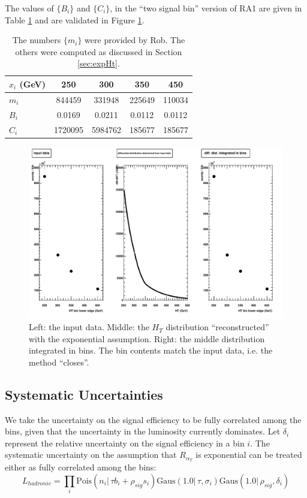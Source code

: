 The values of $\{B_i\}$ and $\{C_i\}$, in the ``two signal bin'' version of RA1 are given in Table \ref{tab:bsandcs}
and are validated in Figure \ref{fig:validationPlots}.
\begin{table}[hb]
  \begin{tabular}{| l | c c c c |}
    \hline
    $x_i$ (GeV) & 250 & 300 & 350 & 450 \\
    \hline
    $m_i$ & 844459 & 331948 & 225649 & 110034 \\
    $B_i$ & 0.0169 & 0.0211 & 0.0112 & 0.0112 \\
    $C_i$ & 1720095 & 5984762 & 185677 & 185677 \\
    \hline
  \end{tabular}
  \caption{The numbers $\{m_i\}$ were provided by Rob.  The others were computed as discussed in Section \ref{sec:expHt}.}
  \label{tab:bsandcs}
\end{table}

\begin{figure}[ht]
  \includegraphics[width=1.2\textwidth]{totalBackgroundExpHt}
  \caption{Left: the input data.
    Middle: the $H_T$ distribution ``reconstructed'' with the exponential assumption.
    Right: the middle distribution integrated in bins.  The bin contents match the input data, i.e. the method ``closes''.}
  \label{fig:validationPlots}
\end{figure}

\subsection{Systematic Uncertainties}
\label{sec:sysUnc}
We take the uncertainty on the signal efficiency to be fully correlated among the bins, given that the uncertainty in the luminosity currently dominates.
Let $\delta_{i}$ represent the relative uncertainty on the signal efficiency in a bin $i$.
The systematic uncertainty on the assumption that $R_{\alpha_T}$ is exponential can be treated either as 
fully correlated among the bins:
\begin{equation}
L_{hadronic}=\prod_i \mathrm{Pois}(n_i |\, \tau b_i + \rho_{sig}s_i)\mathrm{Gaus}(1.0 |\,\tau, \sigma_i)\mathrm{Gaus}(1.0 |\,\rho_{sig}, \delta_{i})
\end{equation}

